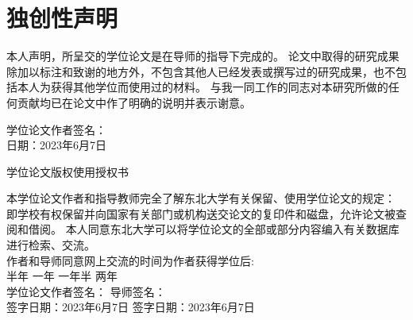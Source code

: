 \chapter*{独创性声明}
\thispagestyle{独创性声明}
\begin{zihao}{4}
{
\linespread{2}\selectfont
本人声明，所呈交的学位论文是在导师的指导下完成的。
论文中取得的研究成果除加以标注和致谢的地方外，不包含其他人已经发表或撰写过的研究成果，也不包括本人为获得其他学位而使用过的材料。
与我一同工作的同志对本研究所做的任何贡献均已在论文中作了明确的说明并表示谢意。
\begin{flushright}
    学位论文作者签名：\hspace*{5em} \\
    日\hspace*{3.73em}期：2023年6月7日
\end{flushright}
}
\end{zihao}
\vspace{2ex}
\begin{center}
    {\heiti {} \selectfont 
    学位论文版权使用授权书}
\end{center}
\par
\begin{zihao}{4}
    {
    \linespread{2}\selectfont
    本学位论文作者和指导教师完全了解东北大学有关保留、使用学位论文的规定：
    即学校有权保留并向国家有关部门或机构送交论文的复印件和磁盘，允许论文被查阅和借阅。
    本人同意东北大学可以将学位论文的全部或部分内容编入有关数据库进行检索、交流。\\[2em]
    作者和导师同意网上交流的时间为作者获得学位后:\\
    半年{\LARGE{\Square}} \hfill 一年{\LARGE{\Square}} \hfill 一年半{\LARGE{\Square}} \hfill 两年{\LARGE{\CheckedBox}} \\[1em]
    学位论文作者签名：\hspace*{8ex} \hfill 导师签名：\hspace*{7.25em} \\
    签字日期：2023年6月7日 \hfill 签字日期：2023年6月7日\par
    }
\end{zihao}
\newpage
\quad
\newpage
